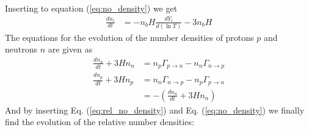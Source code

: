 \documentclass[reprint,english,notitlepage]{revtex4-1}  %
\numberwithin{equation}{section}
\begin{document}
Inserting to equation (\ref{eq:no_density}) we get
\begin{align}
	\frac{d n_i}{dt} &= - n_b H \frac{dY_i}{d(\ln T)} - 3 n_b H
\end{align}
The equations for the evolution of the number densities of protons $p$ and
neutrons $n$ are given as
\begin{align}
	\frac{d n_n}{dt} + 3H n_n &= n_p \Gamma_{p\rightarrow n} - n_n\Gamma_{n\rightarrow p} \\
	\frac{d n_p}{dt} + 3H n_p &= n_n\Gamma_{n\rightarrow p} - n_p \Gamma_{p\rightarrow n}  \\
														&= - \left( \frac{d n_n}{dt} + 3H n_n \right)
\end{align}
And by inserting Eq. (\ref{eq:rel_no_density}) and Eq. (\ref{eq:no_density})
we finally find the evolution of the relative number densities:
\begin{align}

\end{align}
\end{document}
